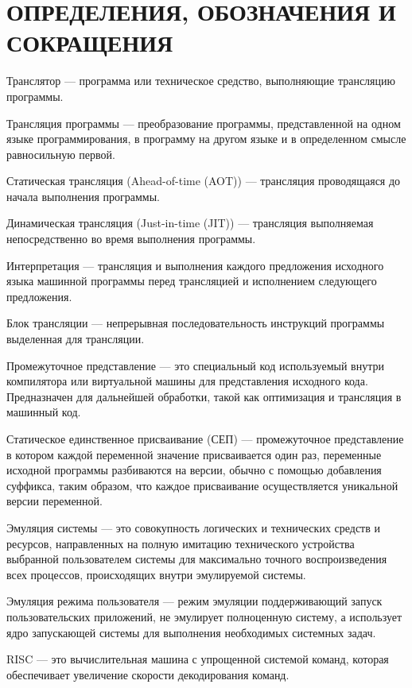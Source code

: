 \section*{ОПРЕДЕЛЕНИЯ, ОБОЗНАЧЕНИЯ И СОКРАЩЕНИЯ}

Транслятор --- программа или техническое средство, выполняющие трансляцию программы. \cite{translate}

Трансляция программы --- преобразование программы, представленной на одном языке программирования, в программу на другом языке и в определенном смысле равносильную первой. \cite{translate}

Статическая трансляция (Ahead-of-time (AOT)) --- трансляция проводящаяся до начала выполнения программы.

Динамическая трансляция (Just-in-time (JIT)) --- трансляция выполняемая непосредственно во время выполнения программы.

Интерпретация --- трансляция и выполнения каждого предложения исходного языка машинной программы перед трансляцией и исполнением следующего предложения. \cite{interpret}

Блок трансляции --- непрерывная последовательность инструкций программы выделенная для трансляции.

Промежуточное представление ---  это специальный код используемый внутри компилятора или виртуальной машины для представления исходного кода. Предназначен для дальнейшей обработки, такой как оптимизация и трансляция в машинный код.

Статическое единственное присваивание (СЕП) --- промежуточное представление в котором каждой переменной значение присваивается один раз, переменные исходной программы разбиваются на версии, обычно с помощью добавления суффикса, таким образом, что каждое присваивание осуществляется уникальной версии переменной.

Эмуляция системы --- это совокупность логических и технических средств и ресурсов, направленных на полную имитацию технического устройства выбранной пользователем системы для максимально точного воспроизведения всех процессов, происходящих внутри эмулируемой системы. 

Эмуляция режима пользователя --- режим эмуляции поддерживающий запуск пользовательских приложений, не эмулирует полноценную систему, а использует ядро запускающей системы для выполнения необходимых системных задач.

RISC --- это вычислительная машина с упрощенной системой команд, которая обеспечивает увеличение скорости декодирования команд. \cite{it_dict}

